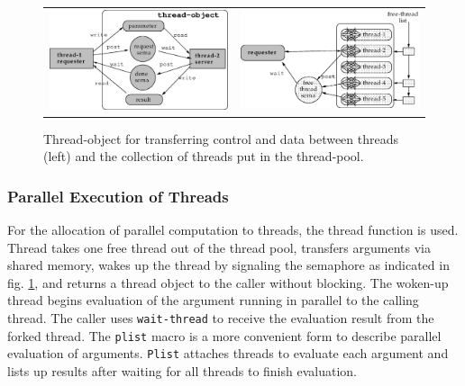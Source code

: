 \begin{figure}
\begin{center}
\begin{tabular}{c c}
\includegraphics[width=7.5cm]{fig/threadobj.ps} &
\includegraphics[width=7.5cm]{fig/threadpool.ps} \\
\end{tabular}
\end{center}
\caption{\label{threadobj}Thread-object for transferring control and data between threads (left) and the collection of threads put in the thread-pool.}
\end{figure}

\subsubsection{Parallel Execution of Threads}
For the allocation of parallel computation to threads, the thread function
is used.
Thread takes one free thread out of the thread pool,
transfers arguments via shared memory, wakes up the thread by signaling
the semaphore as indicated in fig. \ref{threadobj},
and returns a thread object to the caller without blocking.
The woken-up thread begins evaluation of
the argument running in parallel to the calling thread.
The caller uses
{\tt wait-thread} to receive the evaluation result from the forked thread.
The {\tt plist} macro is a more convenient form to describe parallel 
evaluation of arguments.
{\tt Plist} attaches threads to evaluate each argument
and lists up results after waiting for all threads to finish evaluation.

